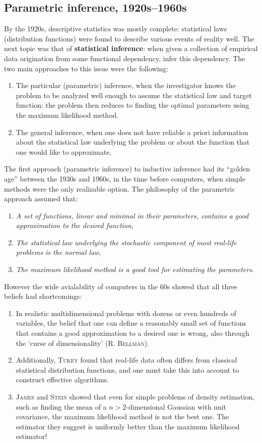 \documentclass{article}
\begin{document}
\subsection{Parametric inference, 1920s--1960s}
By the 1920s, descriptive statistics was mostly complete: statistical laws (distribution functions) were found to describe various events of reality well. The next topic was that of \textbf{statistical inference}: when given a collection of empirical data origination from some functional dependency, infer this dependency. The two main approaches to this issue were the following:
\begin{enumerate}
    \item The particular (parametric) inference, when the investigator knows the problem to be analyzed well enough to assume the statistical law and target function: the problem then reduces to finding the optimal parameters using the maximum likelihood method.
    \item The general inference, when one does not have reliable a priori information about the statistical law underlying the problem or about the function that one would like to approximate.
\end{enumerate}
The first approach (parametric inference) to inductive inference had its ``golden age'' between the 1930s and 1960s, in the time before computers, when simple methods were the only realizable option. The philosophy of the parametric approach assumed that:
\begin{enumerate}
    \item \textit{A set of functions, linear and minimal in their parameters, contains a good approximation to the desired function},
    \item \textit{The statistical law underlying the stochastic component of most real-life problems is the normal law},
    \item \textit{The maximum likelihood method is a good tool for estimating the parameters}.
\end{enumerate}
However the wide avialability of computers in the 60s showed that all three beliefs had shortcomings:
\begin{enumerate}
    \item In realistic multidimensional problems with dozens or even hundreds of variables, the belief that one can define a reasonably small set of functions that contains a good approximation to a desired one is wrong, also through the `curse of dimensionality' (\textsc{R. Bellman}).
    \item Additionally, \textsc{Tukey} found that real-life data often differs from classical statistical distribution functions, and one must take this into account to construct effective algorithms.
    \item \textsc{James} and \textsc{Stein} showed that even for simple problems of density estimation, such as finding the mean of a $n>2$-dimensional Gaussian with unit covariance, the maximum likelihood method is not the best one. The estimator they suggest is uniformly better than the maximum likelihood estimator!
\end{enumerate}
\end{document}

